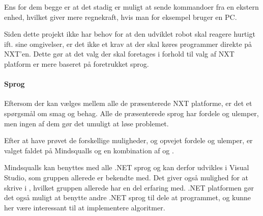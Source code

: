 Ens for dem begge er at det stadig er muligt at sende kommandoer fra en ekstern enhed, hvilket giver mere regnekraft, hvis man for eksempel bruger en PC.

Siden dette projekt ikke har behov for at den udviklet robot skal reagere hurtigt ift. sine omgivelser, er det ikke et krav at der skal køres programmer direkte på NXT'en.
Dette gør at det valg der skal foretages i forhold til valg af NXT platform er mere baseret på foretrukket sprog.

\paragraph{Sprog}
Eftersom der kan vælges mellem alle de præsenterede NXT platforme, er det et spørgsmål om smag og behag.
Alle de præsenterede sprog har fordele og ulemper, men ingen af dem gør det umuligt at løse problemet.

Efter at have prøvet de forskellige muligheder, og opvejet fordele og ulemper, er valget faldet på Mindsqualls og en kombination af \csharp og \fsharp.


Mindsqualls kan benyttes med alle .NET sprog og kan derfor udvikles i Visual Studio, som gruppen allerede er bekendte med. 
Det giver også mulighed for at skrive i \csharp, hvilket gruppen allerede har en del erfaring med. 
.NET platformen gør det også muligt at benytte andre .NET sprog til dele at programmet, og \fsharp kunne her være interessant til at implementere algoritmer.

